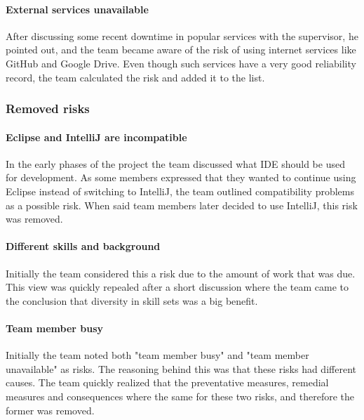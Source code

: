 \paragraph{External services unavailable}
After discussing some recent downtime in popular services with the supervisor, he pointed out, and the team became aware of the risk of using internet services like GitHub and Google Drive. Even though such services have a very good reliability record, the team calculated the risk and added it to the list.

\subsubsection{Removed risks}
\paragraph{Eclipse and IntelliJ are incompatible}
In the early phases of the project the team discussed what IDE should be used for development. As some members expressed that they wanted to continue using Eclipse instead of switching to IntelliJ, the team outlined compatibility problems as a possible risk. When said team members later decided to use IntelliJ, this risk was removed.

\paragraph{Different skills and background}
Initially the team considered this a risk due to the amount of work that was due. This view was quickly repealed after a short discussion where the team came to the conclusion that diversity in skill sets was a big benefit.

\paragraph{Team member busy}
Initially the team noted both "team member busy" and "team member unavailable" as risks. The reasoning behind this was that these risks had different causes. The team quickly realized that the preventative measures, remedial measures and consequences where the same for these two risks, and therefore the former was removed. 
